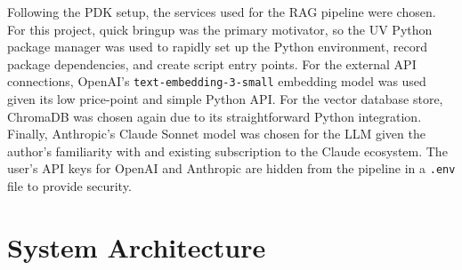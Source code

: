 \documentclass[conference]{IEEEtran}
\begin{document}
Following the PDK setup, the services used for the RAG pipeline were chosen. For this project, quick bringup was the primary motivator, so the UV Python package manager was used to rapidly set up the Python environment, record package dependencies, and create script entry points. For the external API connections, OpenAI's \texttt{text-embedding-3-small} embedding model was used given its low price-point and simple Python API. For the vector database store, ChromaDB was chosen again due to its straightforward Python integration. Finally, Anthropic's Claude Sonnet model was chosen for the LLM given the author's familiarity with and existing subscription to the Claude ecosystem. The user's API keys for OpenAI and Anthropic are hidden from the pipeline in a \texttt{.env} file to provide security.

\section{System Architecture}
\end{document}
